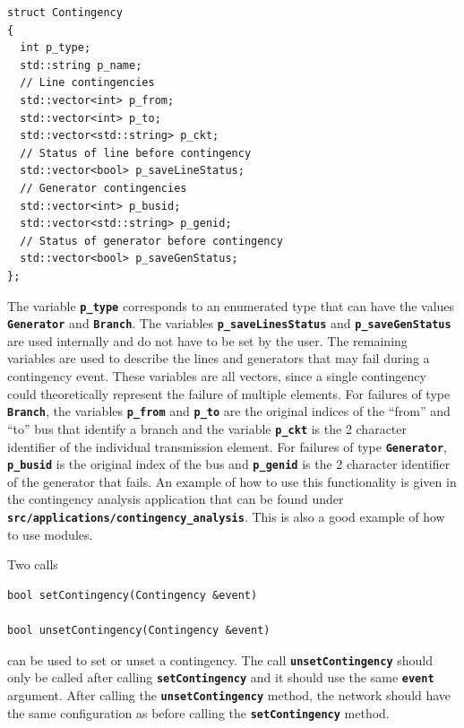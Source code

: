 {
\color{red}
\begin{Verbatim}[fontseries=b]
struct Contingency
{
  int p_type;
  std::string p_name;
  // Line contingencies
  std::vector<int> p_from;
  std::vector<int> p_to;
  std::vector<std::string> p_ckt;
  // Status of line before contingency
  std::vector<bool> p_saveLineStatus;
  // Generator contingencies
  std::vector<int> p_busid;
  std::vector<std::string> p_genid;
  // Status of generator before contingency
  std::vector<bool> p_saveGenStatus;
};
\end{Verbatim}
}

The variable \texttt{\textbf{p\_type}} corresponds to an enumerated type that can have the values \texttt{\textbf{Generator}} and \texttt{\textbf{Branch}}. The variables \texttt{\textbf{p\_saveLinesStatus}} and \texttt{\textbf{p\_saveGenStatus}} are used internally and do not have to be set by the user. The remaining variables are used to describe the lines and generators that may fail during a contingency event. These variables are all vectors, since a single contingency could theoretically represent the failure of multiple elements. For failures of type \texttt{\textbf{Branch}}, the variables \texttt{\textbf{p\_from}} and \texttt{\textbf{p\_to}} are the original indices of the ``from'' and ``to'' bus that identify a branch and the variable \texttt{\textbf{p\_ckt}} is the 2 character identifier of the individual transmission element. For failures of type \texttt{\textbf{Generator}}, \texttt{\textbf{p\_busid}} is the original index of the bus and \texttt{\textbf{p\_genid}} is the 2 character identifier of the generator that fails. An example of how to use this functionality is given in the contingency analysis application that can be found under \texttt{\textbf{src/applications/contingency\_analysis}}. This is also a good example of how to use modules.

Two calls

{
\color{red}
\begin{Verbatim}[fontseries=b]
bool setContingency(Contingency &event)

bool unsetContingency(Contingency &event)
\end{Verbatim}
}

can be used to set or unset a contingency. The call \texttt{\textbf{unsetContingency}} should only be called after calling \texttt{\textbf{setContingency}} and it should use the same \texttt{\textbf{event}} argument. After calling the \texttt{\textbf{unsetContingency}} method, the network should have the same configuration as before calling the \texttt{\textbf{setContingency}} method.


